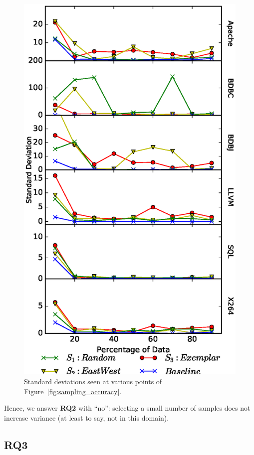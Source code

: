 \documentclass{sig-alternative}
\newcommand{\fig}[1]{Figure~\ref{fig:#1}}
\begin{document}
\begin{figure}[!t]
\includegraphics[width=0.9\linewidth]{Figures/Variance.eps}
\caption{Standard deviations seen at various points of  \fig{sampling_accuracy}.}\label{fig:Variance}
\end{figure}

\begin{myshadowbox}
Hence, we answer {\bf RQ2} with ``no'': selecting a small number of samples does not increase variance (at least to say, not in this domain).
\end{myshadowbox}




\subsection{RQ3}
\end{document}
